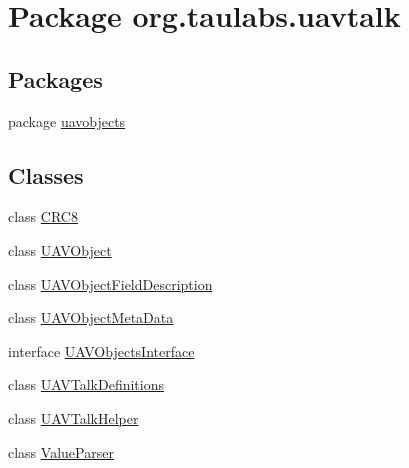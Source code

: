 \hypertarget{namespaceorg_1_1taulabs_1_1uavtalk}{\section{Package org.\-taulabs.\-uavtalk}
\label{namespaceorg_1_1taulabs_1_1uavtalk}
}
\subsection*{Packages}
\begin{DoxyCompactItemize}
\item 
package \hyperlink{namespaceorg_1_1taulabs_1_1uavtalk_1_1uavobjects}{uavobjects}
\end{DoxyCompactItemize}
\subsection*{Classes}
\begin{DoxyCompactItemize}
\item 
class \hyperlink{classorg_1_1taulabs_1_1uavtalk_1_1_c_r_c8}{C\-R\-C8}
\item 
class \hyperlink{classorg_1_1taulabs_1_1uavtalk_1_1_u_a_v_object}{U\-A\-V\-Object}
\item 
class \hyperlink{classorg_1_1taulabs_1_1uavtalk_1_1_u_a_v_object_field_description}{U\-A\-V\-Object\-Field\-Description}
\item 
class \hyperlink{classorg_1_1taulabs_1_1uavtalk_1_1_u_a_v_object_meta_data}{U\-A\-V\-Object\-Meta\-Data}
\item 
interface \hyperlink{interfaceorg_1_1taulabs_1_1uavtalk_1_1_u_a_v_objects_interface}{U\-A\-V\-Objects\-Interface}
\item 
class \hyperlink{classorg_1_1taulabs_1_1uavtalk_1_1_u_a_v_talk_definitions}{U\-A\-V\-Talk\-Definitions}
\item 
class \hyperlink{classorg_1_1taulabs_1_1uavtalk_1_1_u_a_v_talk_helper}{U\-A\-V\-Talk\-Helper}
\item 
class \hyperlink{classorg_1_1taulabs_1_1uavtalk_1_1_value_parser}{Value\-Parser}
\end{DoxyCompactItemize}
